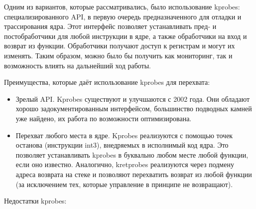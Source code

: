 \documentclass[a4paper,14pt]{extarticle}
\begin{document}
 	Одним из вариантов, которые рассматривались, было использование kprobes: специализированного API, в первую очередь предназначенного для отладки и трассирования ядра. Этот интерфейс позволяет устанавливать пред- и постобработчики для любой инструкции в ядре, а также обработчики на вход и возврат из функции. Обработчики получают доступ к регистрам и могут их изменять. Таким образом, можно было бы получить как мониторинг, так и возможность влиять на дальнейший ход работы.
 	
 	Преимущества, которые даёт использование kprobes для перехвата:
 	\begin{itemize}
 		\item Зрелый API. Kprobes существуют и улучшаются с 2002 года. Они обладают хорошо задокументированным интерфейсом, большинство подводных камней уже найдено, их работа по возможности оптимизирована.
 		\item Перехват любого места в ядре. Kprobes реализуются с помощью точек останова (инструкции int3), внедряемых в исполнимый код ядра. Это позволяет устанавливать kprobes в буквально любом месте любой функции, если оно известно. Аналогично, kretprobes реализуются через подмену адреса возврата на стеке и позволяют перехватить возврат из любой функции (за исключением тех, которые управление в принципе не возвращают).
 	\end{itemize}
 	
 	Недостатки kprobes:
 	
\end{document}
